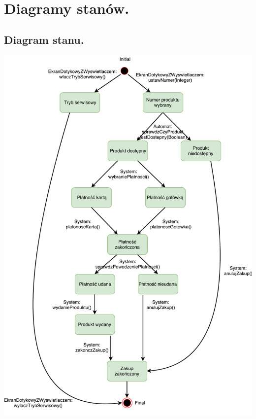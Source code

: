 \documentclass[11pt]{article}
\begin{document}
	\section{Diagramy stanów.}
		\subsection{Diagram stanu.}
		\begin{center}
			\includegraphics[scale=0.7]{stanu1.pdf}
		\end{center}
\end{document}
